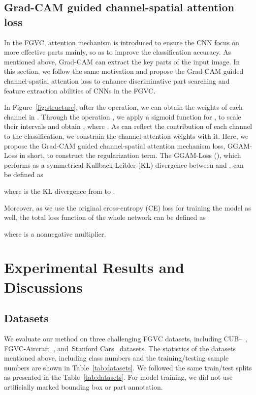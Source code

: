 \documentclass{article}
\begin{document}
\subsection{Grad-CAM guided channel-spatial attention loss}

In the FGVC, attention mechanism is introduced to ensure the CNN focus on more effective parts mainly, so as to improve the classification accuracy. As mentioned above, Grad-CAM can extract the key parts of the input image. In this section, we follow the same motivation and propose the Grad-CAM guided channel-spatial attention loss to enhance discriminative part searching and feature extraction abilities of CNNs in the FGVC. 

In Figure~\ref{fig:structure}, after the  operation, we can obtain the weights  of each channel in . Through the operation , we apply a sigmoid function for , to scale their intervals and obtain , where . As  can reflect the contribution of each channel to the classification, we constrain the channel attention weights  with it. Here, we propose the Grad-CAM guided channel-spatial attention mechanism loss, GGAM-Loss in short, to construct the regularization term. The GGAM-Loss (), which performs as a symmetrical Kullback-Leibler (KL) divergence between  and , can be defined as



\noindent where  is the KL divergence from  to .

Moreover, as we use the original cross-entropy (CE) loss  for training the model as well, the total loss function  of the whole network can be defined as



\noindent where  is a nonnegative multiplier.






 

\section{Experimental Results and Discussions}

\subsection{Datasets}

We evaluate our method on three challenging FGVC datasets, including CUB--~\cite{birds}, FGVC-Aircraft~\cite{air}, and~Stanford Cars~\cite{cars} datasets. The statistics of the datasets mentioned above, including class numbers and the training/testing sample numbers are shown in Table~\ref{tab:datasets}. We followed the same train/test splits as presented in the Table~\ref{tab:datasets}. For model training, we did not use artificially marked bounding box or part annotation.
\vspace{-1mm}
\end{document}
